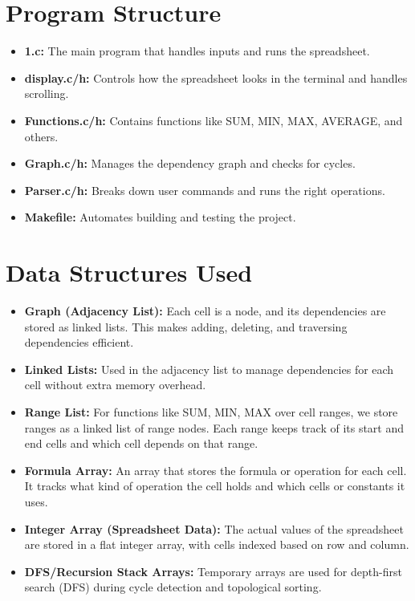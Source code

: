 \documentclass{article}
\begin{document}
\section{Program Structure}
\begin{itemize}
    \item \textbf{1.c:} The main program that handles inputs and runs the spreadsheet.
    \item \textbf{display.c/h:} Controls how the spreadsheet looks in the terminal and handles scrolling.
    \item \textbf{Functions.c/h:} Contains functions like SUM, MIN, MAX, AVERAGE, and others.
    \item \textbf{Graph.c/h:} Manages the dependency graph and checks for cycles.
    \item \textbf{Parser.c/h:} Breaks down user commands and runs the right operations.
    \item \textbf{Makefile:} Automates building and testing the project.
\end{itemize}
\section{Data Structures Used}

\begin{itemize}
    \item \textbf{Graph (Adjacency List):} 
    Each cell is a node, and its dependencies are stored as linked lists. This makes adding, deleting, and traversing dependencies efficient.
    
    \item \textbf{Linked Lists:} 
    Used in the adjacency list to manage dependencies for each cell without extra memory overhead.

    \item \textbf{Range List:} 
    For functions like SUM, MIN, MAX over cell ranges, we store ranges as a linked list of range nodes. Each range keeps track of its start and end cells and which cell depends on that range.

    \item \textbf{Formula Array:} 
    An array that stores the formula or operation for each cell. It tracks what kind of operation the cell holds and which cells or constants it uses.

    \item \textbf{Integer Array (Spreadsheet Data):} 
    The actual values of the spreadsheet are stored in a flat integer array, with cells indexed based on row and column.

    \item \textbf{DFS/Recursion Stack Arrays:} 
    Temporary arrays are used for depth-first search (DFS) during cycle detection and topological sorting.
\end{itemize}
\end{document}
